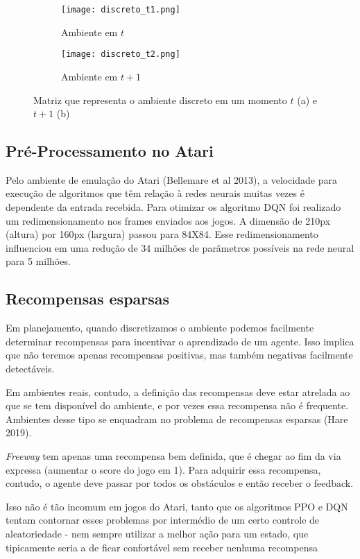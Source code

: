 \documentclass[letterpaper]{article} %
\begin{document}
\begin{figure}[h]
     \begin{subfigure}[h]{0.2\textwidth}
         \centering
         \texttt{[image: discreto\_t1.png]}
         \caption{Ambiente em $t$}
     \end{subfigure}
     \hfill
     \begin{subfigure}[h]{0.2\textwidth}
         \texttt{[image: discreto\_t2.png]}
         \caption{Ambiente em $t+1$}
     \end{subfigure}
        \caption{Matriz que representa o ambiente discreto em um momento $t$ (a) e $t+1$ (b)}
\end{figure}

\subsection{Pré-Processamento no Atari}
Pelo ambiente de emulação do Atari (Bellemare et al 2013), a velocidade para execução de algoritmos que têm relação à redes neurais muitas vezes é dependente da entrada recebida. Para otimizar os algoritmo DQN foi realizado um redimensionamento nos frames enviados aos jogos. A dimensão de 210px (altura) por 160px (largura) passou para 84X84. Esse redimensionamento influenciou em uma redução de 34 milhões de parâmetros possíveis na rede neural para 5 milhões.

\subsection{Recompensas esparsas}
Em planejamento, quando discretizamos o ambiente podemos facilmente determinar recompensas para incentivar o aprendizado de um agente. Isso implica que não teremos apenas recompensas positivas, mas também negativas facilmente detectáveis.

Em ambientes reais, contudo, a definição das recompensas deve estar atrelada ao que se tem disponível do ambiente, e por vezes essa recompensa não é frequente. Ambientes desse tipo se enquadram no problema de recompensas esparsas (Hare 2019).

\textit{Freeway} tem apenas uma recompensa bem definida, que é chegar ao fim da via expressa (aumentar o score do jogo em 1). Para adquirir essa recompensa, contudo, o agente deve passar por todos os obstáculos e então receber o feedback.

Isso não é tão incomum em jogos do Atari, tanto que os algoritmos PPO e DQN tentam contornar esses problemas por intermédio de um certo controle de aleatoriedade - nem sempre utilizar a melhor ação para um estado, que tipicamente seria a de ficar confortável sem receber nenhuma recompensa
\end{document}
